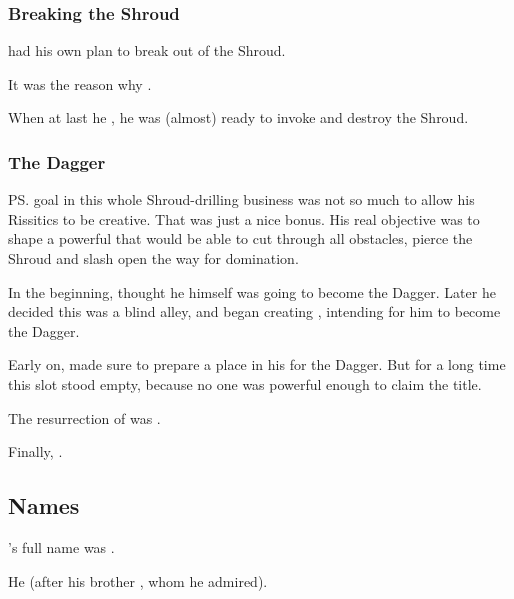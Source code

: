 \subsubsection{Breaking the Shroud}
\Secherdamon{} had his own plan to break out of the Shroud. 

It was the reason why . 

When at last he , he was (almost) ready to invoke  and destroy the Shroud. 





\subsubsection{The Dagger}
%
\ps{\Secherdamon} goal in this whole Shroud-drilling business was not so much to allow his Rissitics to be creative. 
That was just a nice bonus.
His real objective was to shape a powerful \vertex{} that would be able to cut through all obstacles, pierce the Shroud and slash open the way for \xsic{} domination. 

In the beginning, \Secherdamon{} thought he himself was going to become the Dagger. 
Later he decided this was a blind alley, and began creating \Vizsherioch, intending for him to become the Dagger. 

Early on, \Secherdamon{} made sure to prepare a place in his \matrix{} for the Dagger. 
But for a long time this slot stood empty, because no one was powerful enough to claim the title. 

The resurrection of \Nithdornazsh{} was . 

Finally, . 









\subsection{Names}
\Secherdamon's full name was \Irocas \Veldraxx \Nexagglachel \Secherdamon. 

He  (after his brother , whom he admired). 








